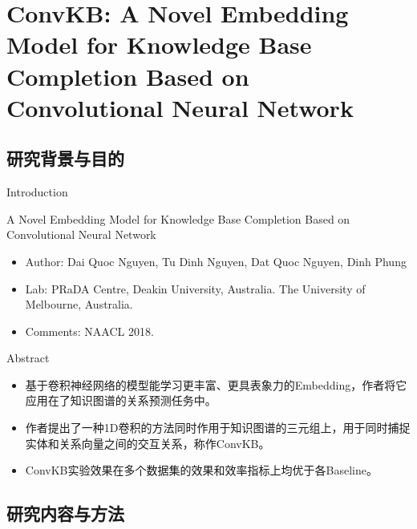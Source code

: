 \section{ConvKB: A Novel Embedding Model for Knowledge Base Completion Based on Convolutional Neural Network}
\subsection{研究背景与目的}

\begin{frame}[c]{Introduction}

\begin{block}{\small A Novel Embedding Model for Knowledge Base Completion Based on Convolutional Neural Network}
	\begin{itemize}
	    \item Author: Dai Quoc Nguyen, Tu Dinh Nguyen, Dat Quoc Nguyen, Dinh Phung
	    \item Lab: PRaDA Centre, Deakin University, Australia. The University of Melbourne, Australia.
	    \item Comments: NAACL 2018.
	\end{itemize}
\end{block}

\begin{block}{Abstract}
	\begin{itemize}
	    \item 基于卷积神经网络的模型能学习更丰富、更具表象力的Embedding，作者将它应用在了知识图谱的关系预测任务中。
	    \item 作者提出了一种1D卷积的方法同时作用于知识图谱的三元组上，用于同时捕捉实体和关系向量之间的交互关系，称作ConvKB。
	    \item ConvKB实验效果在多个数据集的效果和效率指标上均优于各Baseline。
	\end{itemize}
\end{block}

\end{frame}

\subsection{研究内容与方法}

